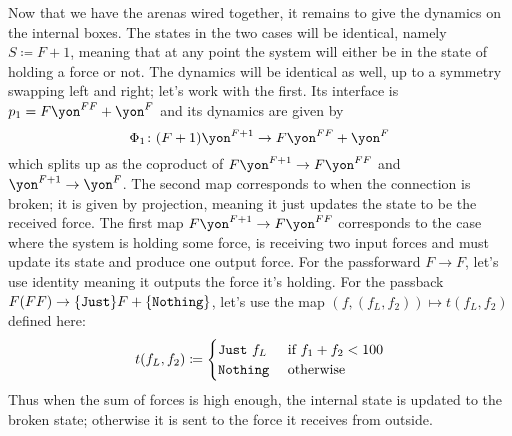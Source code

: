 \documentclass[Book-Poly]{subfiles}
\begin{document}
\begin{example}
Now that we have the arenas wired together, it remains to give the dynamics on the internal boxes. The states in the two cases will be identical, namely $S\coloneqq F+1$, meaning that at any point the system will either be in the state of holding a force or not. The dynamics will be identical as well, up to a symmetry swapping left and right; let's work with the first. Its interface is $p_1=F\yon^{FF}+\yon^F$ and its dynamics are given by
\[\Phi_1\colon (F+1)\yon^{F+1}\to F\yon^{FF}+\yon^F\]
which splits up as the coproduct of $F\yon^{F+1}\to F\yon^{FF}$ and $\yon^{F+1}\to\yon^F$. The second map corresponds to when the connection is broken; it is given by projection, meaning it just updates the state to be the received force. The first map  $F\yon^{F+1}\to F\yon^{FF}$ corresponds to the case where the system is holding some force, is receiving two input forces and must update its state and produce one output force. For the passforward $F\to F$, let's use identity meaning it outputs the force it's holding. For the passback $F(FF)\to \{\texttt{Just}\}F+\{\texttt{Nothing}\}$, let's use the map $(f,(f_L,f_2))\mapsto t(f_L,f_2)$ defined here:
\[
t(f_L,f_2)\coloneqq
\begin{cases}
	\texttt{Just}~f_L&\textnormal{ if }f_1+f_2<100\\
	\texttt{Nothing}&\textnormal{ otherwise}
\end{cases}
\]
Thus when the sum of forces is high enough, the internal state is updated to the broken state; otherwise it is sent to the force it receives from outside.
\end{example}
\end{document}

